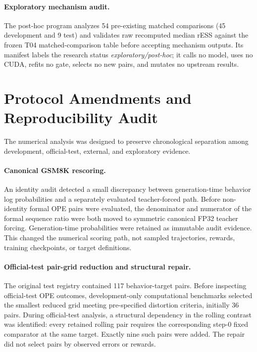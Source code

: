 \documentclass[10pt]{article}
\theoremstyle{remark}
\begin{document}
\paragraph{Exploratory mechanism audit.}
The post-hoc program analyzes 54 pre-existing matched comparisons (45 development and 9 test) and validates raw recomputed median rESS against the frozen T04 matched-comparison table before accepting mechanism outputs. Its manifest labels the research status \emph{exploratory/post-hoc}; it calls no model, uses no CUDA, refits no gate, selects no new pairs, and mutates no upstream results.

\section{Protocol Amendments and Reproducibility Audit}
\label{app:protocol}
The numerical analysis was designed to preserve chronological separation among development, official-test, external, and exploratory evidence.

\paragraph{Canonical GSM8K rescoring.}
An identity audit detected a small discrepancy between generation-time behavior log probabilities and a separately evaluated teacher-forced path. Before non-identity formal OPE pairs were evaluated, the denominator and numerator of the formal sequence ratio were both moved to symmetric canonical FP32 teacher forcing. Generation-time probabilities were retained as immutable audit evidence. This changed the numerical scoring path, not sampled trajectories, rewards, training checkpoints, or target definitions.

\paragraph{Official-test pair-grid reduction and structural repair.}
The original test registry contained 117 behavior-target pairs. Before inspecting official-test OPE outcomes, development-only computational benchmarks selected the smallest reduced grid meeting pre-specified distortion criteria, initially 36 pairs. During official-test analysis, a structural dependency in the rolling contrast was identified: every retained rolling pair requires the corresponding step-0 fixed comparator at the same target. Exactly nine such pairs were added. The repair did not select pairs by observed errors or rewards.
\end{document}

